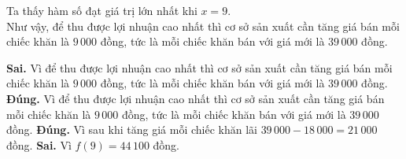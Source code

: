 \begin{ex}
{\begin{center}
\begin{tikzpicture}
			\end{tikzpicture}
		\end{center} Ta thấy hàm số đạt giá trị lớn nhất khi $x=9$.\\
		Như vậy, để thu được lợi nhuận cao nhất thì cơ sở sản xuất cần tăng giá bán mỗi chiếc khăn là $9\,000$ đồng, tức là mỗi chiếc khăn bán với giá mới là $39\,000$ đồng.
		\begin{itemchoice}
			\itemch \textbf{Sai.} Vì để thu được lợi nhuận cao nhất thì cơ sở sản xuất cần tăng giá bán mỗi chiếc khăn là $9\,000$ đồng, tức là mỗi chiếc khăn bán với giá mới là $39\,000$ đồng.
			\itemch \textbf{Đúng.} Vì để thu được lợi nhuận cao nhất thì cơ sở sản xuất cần tăng giá bán mỗi chiếc khăn là $9\,000$ đồng, tức là mỗi chiếc khăn bán với giá mới là $39\,000$ đồng.	
			\itemch \textbf{Đúng.} Vì sau khi tăng giá mỗi chiếc khăn lãi $39\,000-18\,000=21\,000$ đồng.
			\itemch \textbf{Sai.} Vì  $f(9)=44\,100$ đồng.
		\end{itemchoice}
	}
\end{ex}

